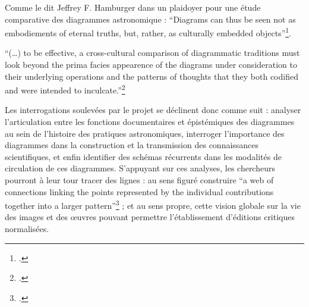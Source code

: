 Comme le dit Jeffrey F. Hamburger dans un plaidoyer pour une étude
comparative des diagrammes astronomique : ``Diagrams can thus be seen
not as embodiements of eternal truths, but, rather, as culturally
embedded objects''\footcite[p.7]{safran_diagram_2022}.

\begin{kwote}
``(\ldots) to be effective, a cross-cultural comparison of diagrammatic
traditions must look beyond the prima facies appearence of the diagrams
under consideration to their underlying operations and the patterns of
thoughts that they both codified and were intended to
inculcate.''\footcite[p.3]{safran_diagram_2022}
\end{kwote}         

Les interrogations soulevées par le projet \eida se déclinent donc comme
suit : analyser l'articulation entre les fonctions documentaires et
épistémiques des diagrammes au sein de l'histoire des pratiques
astronomiques, interroger l'importance des diagrammes dans la
construction et la transmission des connaissances scientifiques, et
enfin identifier des schémas récurrents dans les modalités de
circulation de ces diagrammes. S'appuyant sur ces analyses, les
chercheurs pourront à leur tour tracer des lignes : au sens figuré
construire ``a web of connections linking the points represented by the
individual contributions together into a larger pattern''\footcite[p.10]{safran_diagram_2022} ; et
au sens propre, cette vision globale sur la vie des images et des œuvres
pouvant permettre l'établissement d'éditions critiques normalisées.